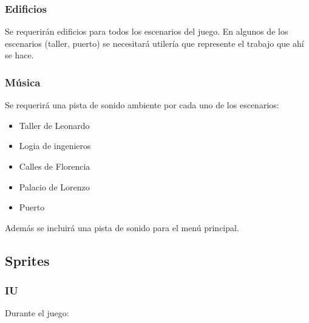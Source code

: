 \subsubsection[Edificios]{ Edificios}
\hypertarget{Toc484614270}{}{
Se requerir\'an edificios para todos los escenarios del juego. En algunos de los escenarios (taller, puerto) se
necesitar\'a utiler\'ia que represente el trabajo que ah\'i se hace.}

\subsubsection[M\'usica]{ M\'usica}
\hypertarget{Toc484614271}{}{
Se requerir\'a una pista de sonido ambiente por cada uno de los escenarios:}

\liststyleLFOvii
\setcounter{saveenum}{\value{enumi}}
\begin{itemize}
\setcounter{enumi}{\value{saveenum}}
\item {
Taller de Leonardo}
\item {
Logia de ingenieros}
\item {
Calles de Florencia}
\item {
Palacio de Lorenzo}
\item {
Puerto}
\end{itemize}
{
Adem\'as se incluir\'a una pista de sonido para el men\'u principal.}

\subsection[Sprites]{ Sprites}
\hypertarget{Toc484614272}{}\subsubsection[IU]{ IU}
\hypertarget{Toc484614273}{}{
Durante el juego:}

